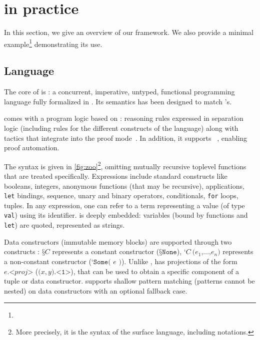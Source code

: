 \section{\Zoo in practice}
\label{sec:zoo}



In this section, we give an overview of our framework.
We also provide a minimal example\footnote{} demonstrating its use.

\subsection{Language}

The core of \Zoo is \ZooLang: a concurrent, imperative, untyped, functional programming language fully formalized in \Rocq.
Its semantics has been designed to match \OCaml's.

\ZooLang comes with a program logic based on \Iris: reasoning rules expressed in separation logic (including rules for the different constructs of the language) along with \Rocq tactics that integrate into the \Iris proof mode~\cite{DBLP:conf/popl/KrebbersTB17,DBLP:journals/pacmpl/KrebbersJ0TKTCD18}.
In addition, it supports \Diaframe~\cite{DBLP:conf/pldi/MulderKG22,DBLP:journals/pacmpl/MulderK23}, enabling proof automation.

The \ZooLang syntax is given in \cref{fig:zoo}\footnote{More precisely, it is the syntax of the surface language, including \Rocq notations.}, omitting mutually recursive toplevel functions that are treated specifically.
Expressions include standard constructs like booleans, integers, anonymous functions (that may be recursive), applications, \texttt{let} bindings, sequence, unary and binary operators, conditionals, \texttt{for} loops, tuples.
In any expression, one can refer to a \Rocq term representing a \ZooLang value (of type \texttt{val}) using its \Rocq identifier.
\ZooLang is deeply embedded: variables (bound by functions and \texttt{let}) are quoted, represented as strings.

Data constructors (immutable memory blocks) are supported through two constructs : $\texttt{§}C$ represents a constant constructor (\eg $\texttt{§}\texttt{None}$), $\texttt{‘} C\ \texttt{(} e_1 \texttt{,} \dots \texttt{,} e_n \texttt{)}$ represents a non-constant constructor (\eg $\texttt{‘} \texttt{Some( } e \texttt{ )}$).
Unlike \OCaml, \ZooLang has projections of the form $e \texttt{.<} \mathit{proj} \texttt{>}$ (\eg $\texttt{(} x, y \texttt{).<1>}$), that can be used to obtain a specific component of a tuple or data constructor.
\ZooLang supports shallow pattern matching (patterns cannot be nested) on data constructors with an optional fallback case.

